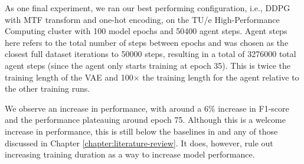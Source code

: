 As one final experiment, we ran our best performing configuration, i.e., DDPG with MTF transform and one-hot encoding, on the TU/e High-Performance Computing cluster with 100 model epochs and 50400 agent steps.
Agent steps here refers to the total number of steps between epochs and was chosen as the closest full dataset iterations to 50000 steps, resulting in a total of 3276000 total agent steps (since the agent only starts training at epoch 35).
This is twice the training length of the VAE and 100$\times$ the training length for the agent relative to the other training runs.

We observe an increase in performance, with around a 6\% increase in F1-score and the performance plateauing around epoch 75.
Although this is a welcome increase in performance, this is still below the baselines in \cite{zheng2019zero} and any of those discussed in Chapter \ref{chapter:literature-review}.
It does, however, rule out increasing training duration as a way to increase model performance.
